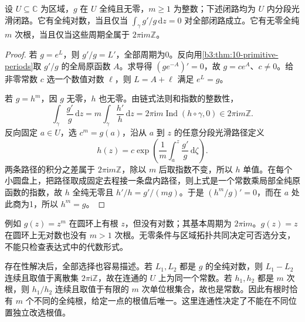\begin{proposition}[对数与根的周期条件]\label{b3:prop:10-log-root-periods}
设 \(U\subseteq\mathbb C\) 为区域，\(g\) 在 \(U\) 全纯且无零，\(m\ge1\) 为整数；下述闭路均为 \(U\) 内分段光滑闭路。它有全纯对数，当且仅当 \(\int_\gamma g'/g\,\mathrm{d}z=0\) 对全部闭路成立。它有无零全纯 \(m\) 次根，当且仅当这些周期全属于 \(2\pi\mathrm{i}m\mathbb Z\)。
\end{proposition}
\begin{proof}
若 \(g=e^L\)，则 \(g'/g=L'\)，全部周期为0。反向用\cref{b3:thm:10-primitive-periods}取 \(g'/g\) 的全局原函数 \(A\)。求导得 \((g e^{-A})'=0\)，故 \(g=c e^A\)、\(c\ne0\)。给非零常数 \(c\) 选一个数值对数 \(\ell\)，则 \(L=A+\ell\) 满足 \(e^L=g\)。

若 \(g=h^m\)，因 \(g\) 无零，\(h\) 也无零。由链式法则和指数的整数性，
\[
 \int_\gamma\frac{g'}g\,\mathrm{d}z
 =m\int_\gamma\frac{h'}h\,\mathrm{d}z
 =2\pi\mathrm{i}m\operatorname{Ind}(h\circ\gamma,0)
 \in2\pi\mathrm{i}m\mathbb Z.
\]
反向固定 \(a\in U\)，选 \(c^m=g(a)\)，沿从 \(a\) 到 \(z\) 的任意分段光滑路径定义
\[
 h(z)=c\exp\left(\frac1m\int_a^z\frac{g'}g\,\mathrm{d}\zeta\right).
\]
两条路径的积分之差属于 \(2\pi\mathrm{i}m\mathbb Z\)，除以 \(m\) 后取指数不变，所以 \(h\) 单值。在每个小圆盘上，把路径取成固定去程接一条盘内路径，则上式是一个常数乘局部全纯原函数的指数，故 \(h\) 全纯无零且 \(h'/h=g'/(mg)\)。于是 \((h^m/g)'=0\)，而在 \(a\) 处此商为1，所以 \(h^m=g\)。
\end{proof}
例如 \(g(z)=z^m\) 在圆环上有根 \(z\)，但没有对数；其基本周期为 \(2\pi\mathrm{i}m\)。\(g(z)=z\) 在圆环上无对数也没有 \(m>1\) 次根。无零条件与区域拓扑共同决定可否选分支，不能只检查表达式中的代数形式。

\ProseParagraphBreak
存在性解决后，全部选择也容易描述。若 \(L_1,L_2\) 都是 \(g\) 的全纯对数，则 \(L_1-L_2\) 连续且取值于离散集 \(2\pi\mathrm{i}\mathbb Z\)，故在连通的 \(U\) 上为同一个常数。若 \(h_1,h_2\) 都是 \(m\) 次根，则 \(h_1/h_2\) 连续且取值于有限的 \(m\) 次单位根集合，故也是常数。因此有根时恰有 \(m\) 个不同的全纯根，给定一点的根值后唯一。这里连通性决定了不能在不同位置独立改选根值。

